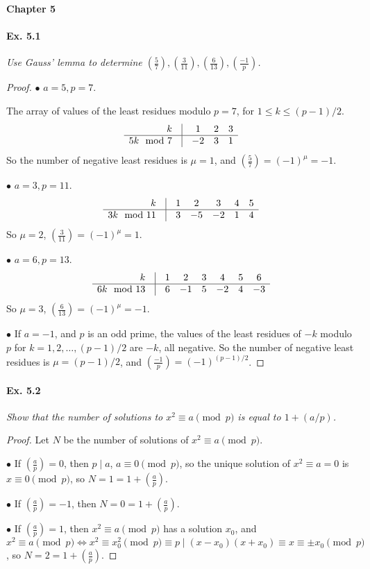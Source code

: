 \documentclass[11pt,a4paper]{article}
\newcommand{\legendre}[2]{\genfrac{(}{)}{}{}{#1}{#2}}
\begin{document}
\newpage


{ \Large \bf Chapter 5}

\paragraph{Ex. 5.1}

{\it  Use Gauss' lemma to determine $\legendre{5}{7}, \legendre{3}{11}, \legendre{6}{13},\legendre{-1}{p}$.
}

\begin{proof}
$\bullet$ $a = 5, p=7$.

The array of values of the least residues modulo $p=7$, for $1\leq k \leq (p-1)/2$.
$$
\begin{array}{rcccc}
  k & \vline & 1 & 2 & 3\\
 \hline
    5k \mod 7& \vline & -2  & 3 & 1
\end{array}
$$
So  the number of negative least residues is $\mu = 1$, and $\legendre{5}{7} =(-1)^{\mu} =  -1$.

$\bullet$ $a=3,p=11$.
$$
\begin{array}{rcccccc}
  k & \vline & 1 & 2 & 3 &4 &5 \\
 \hline
    3k \mod 11& \vline & 3  & -5 & -2 & 1&  4
\end{array}
$$
So $\mu = 2$, $\legendre{3}{11} = (-1)^\mu = 1$.

$\bullet$ $a=6,p=13$.
$$
\begin{array}{rccccccc}
  k & \vline & 1 & 2 & 3 &4 &5 &6\\
 \hline
    6k \mod 13& \vline & 6  & -1& 5 & -2 &  4& -3
\end{array}
$$
So $\mu = 3$, $\legendre{6}{13} = (-1)^\mu = -1$.

$\bullet$ If $a=-1$, and $p$ is an odd prime, the values of the least residues of $-k$ modulo $p$ for $k=1,2,\ldots,(p-1)/2$ are $-k$, all negative. So  the number of negative least residues is $\mu = (p-1)/2$, and 
$\legendre{-1}{p} = (-1)^{(p-1)/2}$.
\end{proof}

\paragraph{Ex. 5.2}

{\it  Show that the number of solutions to $x^2 \equiv a \pmod p$ is equal to $1 + (a/p)$.
}

\begin{proof} Let $N$ be the number of solutions of $x^2\equiv a \pmod p$.

$\bullet$ If $\legendre{a}{p} = 0$, then $p\mid a$, $a\equiv 0 \pmod p$, so the unique solution of $x^2 \equiv a = 0$ is $x\equiv 0 \pmod p$, so $N = 1 = 1 + \legendre{a}{p}$.

$\bullet$ If $\legendre{a}{p} = -1$, then $N = 0 = 1 + \legendre{a}{p}$.

$\bullet$ If $\legendre{a}{p} = 1$, then $x^2\equiv a \pmod p$ has a solution $x_0$, and $x^2 \equiv a \pmod p\iff x^2 \equiv x_0^2 \pmod p\equiv p \mid (x-x_0)(x+x_0) \equiv x\equiv \pm x_0 \pmod p$, so $N = 2 = 1 + \legendre{a}{p}$.
\end{proof}
\end{document}
